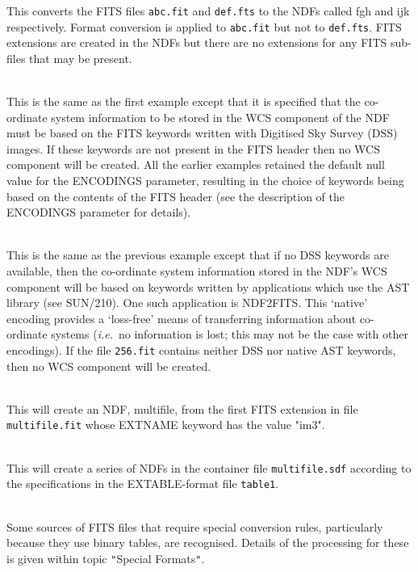 \documentclass[twoside,11pt]{article}
\newcommand{\htmlref}[2]{#1}
\newcommand{\xref}[3]{#1}
\newlength{\sstexampleslength}
\newcommand{\sstexamplesubsection}[2]{\sloppy
\item[\parbox{\sstexampleslength}{\ssttt #1}] \mbox{} \vspace{0.5ex}
\\ #2 \vspace{1.0ex}}
\newcommand{\sstnotes}[1]{\pagebreak[3] \item[Notes:] \mbox{} \\[1.3ex] #1}
\newcommand{\sstexamplesubsection}[2]{
   \vspace{-1.0ex} \item[{\ssttt #1}] #2 \vspace{0.2ex}}
\newcommand{\sstnotes}[1]{\item[Notes:]
      \begin{description}
         #1
      \end{description}
   }
\begin{document}
{{{         This converts the FITS files \texttt{abc.fit} and \texttt{def.fts}
         to the NDFs called fgh and ijk respectively.
         Format conversion is applied
         to \texttt{abc.fit} but not to \texttt{def.fts}.
         FITS extensions are created
         in the NDFs but there are no extensions for any FITS sub-files
         that may be present.
         }
      \sstexamplesubsection{
         fits2ndf 256.fit f256 fmtcnv=f encodings=DSS
      }{
         This is the same as the first example except that it is specified 
         that the co-ordinate system information to be stored in the WCS 
         component of the NDF must be based on the FITS keywords written 
         with Digitised Sky Survey (DSS) images. If these keywords are not
         present in the FITS header then no WCS component will be created.
         All the earlier examples retained the default null value for the
         ENCODINGS parameter, resulting in the choice of keywords being
         based on the contents of the FITS header (see the description of
         the ENCODINGS parameter for details).
      }
      \sstexamplesubsection{
         fits2ndf 256.fit f256 fmtcnv=f encodings="DSS,native"
      }{
         This is the same as the previous example except that if no
         DSS keywords are available, then the co-ordinate system
         information stored in the NDF's WCS component will be based on
         keywords written by applications which use the AST library (see
         \xref{SUN/210}{sun210}{}).  One such application is
         \htmlref{NDF2FITS}{NDF2FITS}.   This `native'
         encoding provides a `loss-free' means of transferring
         information about co-ordinate systems (\textit{i.e.}\ no information is
         lost; this may not be the case with other encodings).  If the
         file \texttt{256.fit} contains neither DSS nor native AST keywords, then
         no WCS component will be created.
      }
      \sstexamplesubsection{
         fits2ndf "multifile.fit[extname=im3]" *
      }{
         This will create an NDF, multifile, from the first FITS
         extension in file \texttt{multifile.fit} whose EXTNAME keyword has
         the value "im3".
      }
      \sstexamplesubsection{
         fits2ndf multifile.fit  multifile extable=table1
      }{    
         This will create a series of NDFs in the container file
         \texttt{multifile.sdf} according to the specifications in the 
         EXTABLE-format file \texttt{table1}.
      }
   }
   \label{fits2ndf_notes}
   \sstnotes{
      Some sources of FITS files that require special conversion
      rules, particularly because they use binary tables, are
      recognised.  Details of the processing for these is given within
      topic 
      \htmlref{\texttt{"}Special Formats\texttt{"}}{special_formats}.

}}
\end{document}

